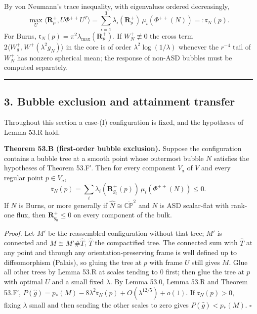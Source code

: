 \documentclass[
  10pt,
]{report}
\begin{document}
By von Neumann's trace inequality, with eigenvalues ordered
decreasingly, \[
\max_{U}\big\langle\mathbf R^+_p,U\Phi^{++}U^T\big\rangle=\sum_{i=1}^3\lambda_i(\mathbf R^+_p)\,\mu_i(\Phi^{++}(N))=: \mathfrak r_N(p).
\] For Burns, \(\mathfrak r_N(p)=\pi^2\lambda_{\max}(\mathbf R^+_p)\).
If \(W^+_N\not\equiv0\) the cross term
\(2\langle W^+_g,W^+(\lambda^2g_N)\rangle\) in the core is of order
\(\lambda^2\log(1/\lambda)\) whenever the \(r^{-4}\) tail of \(W^+_N\)
has nonzero spherical mean; the response of non-ASD bubbles must be
computed separately.

\begin{center}\rule{0.5\linewidth}{0.5pt}\end{center}

\hypertarget{bubble-exclusion-and-attainment-transfer}{%
\subsection{3. Bubble exclusion and attainment
transfer}\label{bubble-exclusion-and-attainment-transfer}}

Throughout this section a case-(I) configuration is fixed, and the
hypotheses of Lemma 53.R hold.

\textbf{Theorem 53.B (first-order bubble exclusion).} Suppose the
configuration contains a bubble tree at a smooth point whose outermost
bubble \(N\) satisfies the hypotheses of Theorem 53.F′. Then for every
component \(V_a\) of \(V\) and every regular point \(p\in V_a\), \[
\mathfrak r_N(p)=\sum_i\lambda_i(\mathbf R^+_{g_0}(p))\,\mu_i(\Phi^{++}(N))\le0 .
\] If \(N\) is Burns, or more generally if
\(\widehat N\cong\overline{\mathbb{CP}}^2\) and \(N\) is ASD scalar-flat
with rank-one flux, then \(\mathbf R^+_{g_0}\le0\) on every component of
the bulk.

\emph{Proof.} Let \(M'\) be the reassembled configuration without that
tree; \(M'\) is connected and \(M\cong M'\#\widehat T\), \(\widehat T\)
the compactified tree. The connected sum with \(\widehat T\) at any
point and through any orientation-preserving frame is well defined up to
diffeomorphism (Palais), so gluing the tree at \(p\) with frame \(U\)
still gives \(M\). Glue all other trees by Lemma 53.R at scales tending
to 0 first; then glue the tree at \(p\) with optimal \(U\) and a small
fixed \(\lambda\). By Lemma 53.0, Lemma 53.R and Theorem 53.F′,
\(P(\hat g)=p_*(M)-8\lambda^2\mathfrak r_N(p)+O(\lambda^{12/5})+o(1)\).
If \(\mathfrak r_N(p)>0\), fixing \(\lambda\) small and then sending the
other scales to zero gives \(P(\hat g)<p_*(M)\). \(\square\)
\end{document}
